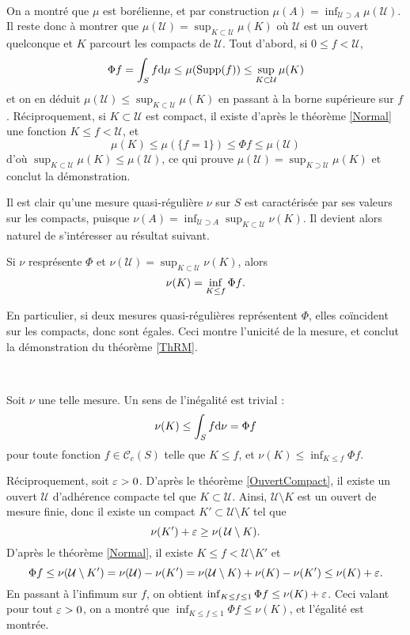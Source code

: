 \documentclass{article}
\begin{document}
\begin{Dem}~

On a montré que $\mu$ est borélienne, et par construction $\mu(A)=\inf_{\mathcal U\supset A}\mu(\mathcal U)$. Il reste donc à montrer que $\mu(\mathcal U)=\sup_{K\subset \mathcal U}\mu(K)$ où $\mathcal U$ est un ouvert quelconque et $K$ parcourt les compacts de $\mathcal U$.
Tout d'abord, si $0\leq f<\mathcal U$,
$$\Phi f=\int_Sf\mathrm{d}\mu\leq\mu(\mathrm{Supp}(f))\leq \sup_{K\subset\mathcal U}\mu(K)$$
et on en déduit $\mu(\mathcal U)\leq\sup_{K\subset \mathcal U}\mu(K)$ en passant à la borne supérieure sur $f$. Réciproquement, si $K\subset\mathcal U$ est compact, il existe d'après le théorème \ref{Normal} une fonction $K\leq f<\mathcal U$, et
$$\mu(K)\leq\mu(\{f=1\})\leq\Phi f\leq\mu(\mathcal U)$$
d'où $\sup_{K\subset \mathcal U}\mu(K)\leq\mu(\mathcal U)$, ce qui prouve $\mu(\mathcal U)=\sup_{K\supset\mathcal U}\mu(K)$ et conclut la démonstration.
\end{Dem}

Il est clair qu'une mesure quasi-régulière $\nu$ sur $S$ est caractérisée par ses valeurs sur les compacts, puisque $\nu(A)=\inf_{\mathcal U\supset A}\sup_{K\subset\mathcal U}\nu(K)$. Il devient alors naturel de s'intéresser au résultat suivant.

\begin{Thm}
Si $\nu$ resprésente $\Phi$ et $\nu(\mathcal U)=\sup_{K\subset\mathcal U}\nu(K)$, alors
$$\nu(K)=\inf_{K\leq f}\Phi f\text.$$
\end{Thm}

En particulier, si deux mesures quasi-régulières représentent $\Phi$, elles coïncident sur les compacts, donc sont égales. Ceci montre l'unicité de la mesure, et conclut la démonstration du théorème \ref{ThRM}.

\begin{Dem}~

Soit $\nu$ une telle mesure. Un sens de l'inégalité est trivial :
$$\nu(K)\leq\int_Sf\mathrm{d}\nu=\Phi f$$
pour toute fonction $f\in\mathcal C_c(S)$ telle que $K\leq f$, et $\nu(K)\leq\inf_{K\leq f}\Phi f$.

Réciproquement, soit $\varepsilon>0$. D'après le théorème \ref{OuvertCompact}, il existe un ouvert $\mathcal U$ d'adhérence compacte tel que $K\subset\mathcal U$. Ainsi, $\mathcal U\setminus K$ est un ouvert de mesure finie, donc il existe un compact $K'\subset\mathcal U\setminus K$ tel que
$$\nu(K')+\varepsilon\geq\nu(\,\mathcal U\setminus K)\text.$$
D'après le théorème \ref{Normal}, il existe $K\leq f<\mathcal U\setminus K'$ et
$$\Phi f \leq \nu(\mathcal U\setminus K')
            = \nu(\mathcal U)-\nu(K')
            = \nu(\mathcal U\setminus K)+\nu(K)-\nu(K')
         \leq \nu(K)+\varepsilon\text.$$
En passant à l'infimum sur $f$, on obtient $\inf_{K\leq f\leq1}\Phi f\leq\nu(K)+\varepsilon$. Ceci valant pour tout $\varepsilon>0$, on a montré que $\inf_{K\leq f\leq1}\Phi f\leq\nu(K)$, et l'égalité est montrée.
\end{Dem}
\end{document}
